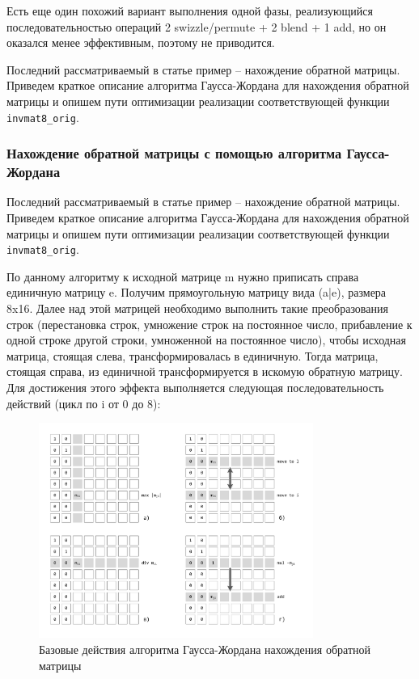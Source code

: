 Есть еще один похожий вариант выполнения одной фазы, реализующийся последовательностью операций 2 swizzle/permute + 2 blend + 1 add, но он оказался менее эффективным, поэтому не приводится.

Последний рассматриваемый в статье пример -- нахождение обратной матрицы.
Приведем краткое описание алгоритма Гаусса-Жордана для нахождения обратной матрицы и опишем пути оптимизации реализации соответствующей функции \texttt{invmat8\_orig}.

\subsubsection{Нахождение обратной матрицы с помощью алгоритма Гаусса-Жордана}

Последний рассматриваемый в статье пример -- нахождение обратной матрицы.
Приведем краткое описание алгоритма Гаусса-Жордана для нахождения обратной матрицы и опишем пути оптимизации реализации соответствующей функции \texttt{invmat8\_orig}.

По данному алгоритму к исходной матрице m нужно приписать справа единичную матрицу e.
Получим прямоугольную матрицу вида (a|e), размера 8x16.
Далее над этой матрицей необходимо выполнить такие преобразования строк (перестановка строк, умножение строк на постоянное число, прибавление к одной строке другой строки, умноженной на постоянное число), чтобы исходная матрица, стоящая слева, трансформировалась в единичную.
Тогда матрица, стоящая справа, из единичной трансформируется в искомую обратную матрицу.
Для достижения этого эффекта выполняется следующая последовательность действий (цикл по i от 0 до 8):

\begin{figure}[ht]
	\centering
		\includegraphics[width=0.8\textwidth]{./pics/text_4_small_matr/invmat8.pdf}
	\caption{Базовые действия алгоритма Гаусса-Жордана нахождения обратной матрицы}
	\label{fig:text_4_small_matr_invmat8}
\end{figure}

